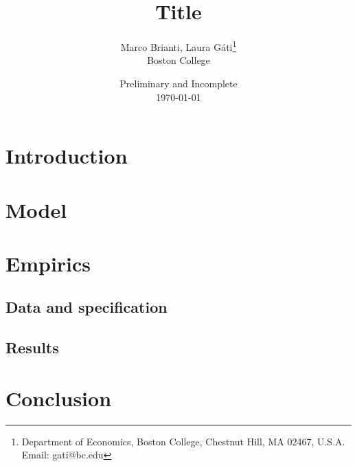 \documentclass[11pt]{article}
\renewcommand{\[}{\begin{equation}}
\renewcommand{\]}{\end{equation}}
\begin{document}
\linespread{1.0}

\title{Title}
\author{Marco Brianti, Laura G\'ati\thanks{%
Department of Economics, Boston College, Chestnut Hill, MA 02467, U.S.A. Email: gati@bc.edu} \\
 Boston College \\
}
\date{Preliminary and Incomplete \\ \today}
\maketitle



\newpage
\section{Introduction}



\section{Model}

\section{Empirics}
\subsection{Data and specification}
\subsection{Results}

\section{Conclusion}


\newpage
\nocite{*}
 
\end{document}
